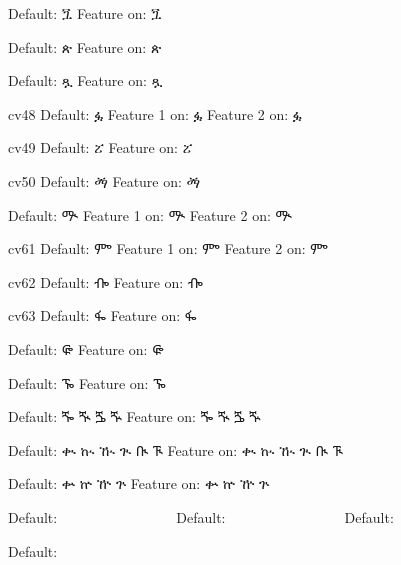 \IndSS Default: ጟ
\IndSS\OTfortytwoone Feature on: ጟ

\IndSS Default: ጵ
\IndSS\OTfortyfive Feature on: ጵ

\IndSS Default: ጿ
\IndSS\OTfortysix Feature on: ጿ

\IndSS cv48 Default: ፏ
\IndSS\OTfortyeightone Feature 1 on: ፏ
\IndSS\OTfortyeighttwo Feature 2 on: ፏ

\IndSS cv49 Default: ፘ
\IndSS\OTfortynine Feature on: ፘ

\IndSS cv50 Default: ፙ
\IndSS\OTfifty Feature on: ፙ

\IndSS Default: ᎁ
\IndSS\OTsixtyone Feature 1 on: ᎁ
\IndSS\OTsixtytwo Feature 2 on: ᎁ

\IndSS cv61  Default: ᎃ
\IndSS\OTsixtyoneone Feature 1 on: ᎃ
\IndSS\OTsixtyonetwo Feature 2 on: ᎃ

\IndSS cv62 Default: ᎇ
\IndSS\OTsixtytwoone Feature on: ᎇ

\IndSS cv63 Default: ᎊ
\IndSS\OTsixtythree Feature on: ᎊ

\IndSS Default: ᎋ
\IndSS\OTsixtyfour Feature on: ᎋ

\IndSS Default: ᎏ
\IndSS\OTsixtyfive Feature on: ᎏ

\IndSS Default: ⶓ ⶔ ⶕ ⶖ
\IndSS\OTseventy Feature on: ⶓ ⶔ ⶕ ⶖ

\IndSS Default: ቊ ኲ ዂ ጒ ᎅ ᎍ
\IndSS\OTeighty Feature on: ቊ ኲ ዂ ጒ ᎅ ᎍ

\IndSS Default: ቍ ኵ ዅ ጕ 
\IndSS\OTeightyfive Feature on: ቍ ኵ ዅ ጕ

\IndSS Default: 𞟠𞟡𞟢𞟣𞟤𞟥𞟦𞟨𞟩𞟪𞟫𞟭𞟮𞟰𞟱𞟲𞟳𞟴𞟵𞟶𞟷𞟸𞟹𞟺𞟻𞟼𞟽𞟾
\IndSS Default: 𞟠፟𞟡፟𞟢፟𞟣፟𞟤፟𞟥፟𞟦፟𞟨፟𞟩፟𞟪፟𞟫፟𞟭፟𞟮፟𞟰፟𞟱፟𞟲፟𞟳፟𞟴፟𞟵፟𞟶፟𞟷፟𞟸፟𞟹፟𞟺፟𞟻፟𞟼፟𞟽፟𞟾፟
\IndSS Default: 𞟫፟ሕ፟𞟲፟ቅ፟

\IndSS Default: 𞟠 𞟡 𞟢 𞟣 𞟤 𞟥 𞟦 𞟨 𞟩 𞟪 𞟫 𞟭 𞟮 𞟰 𞟱 𞟲 𞟳 𞟴 𞟵 𞟶 𞟷 𞟸 𞟹 𞟺 𞟻 𞟼 𞟽 𞟾
\bye
